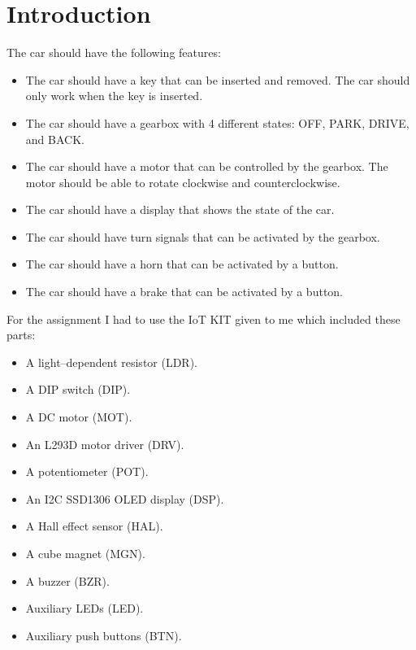 \section{Introduction}
\label{sec:introduction}

The car should have the following features:
\begin{itemize}
    \item The car should have a key that can be inserted and removed. The car should only work when the key is inserted.
    \item The car should have a gearbox with 4 different states: OFF, PARK, DRIVE, and BACK.
    \item The car should have a motor that can be controlled by the gearbox. The motor should be able to rotate clockwise and counterclockwise.
    \item The car should have a display that shows the state of the car.
    \item The car should have turn signals that can be activated by the gearbox.
    \item The car should have a horn that can be activated by a button.
    \item The car should have a brake that can be activated by a button.
\end{itemize}For the assignment I had to use the IoT KIT given to me which included these parts:

\begin{itemize}
    \item A light–dependent resistor (LDR).
    \item A DIP switch (DIP).
    \item A DC motor (MOT).
    \item An L293D motor driver (DRV).
    \item A potentiometer (POT).
    \item An I2C SSD1306 OLED display (DSP).
    \item A Hall effect sensor (HAL).
    \item A cube magnet (MGN).
    \item A buzzer (BZR).
    \item Auxiliary LEDs (LED).
    \item Auxiliary push buttons (BTN).
\end{itemize}

\newpage
